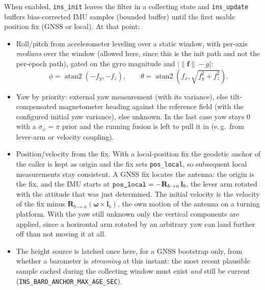 \documentclass[11pt,a4paper]{article}
\newcommand{\vect}[1]{\bm{#1}}
\newcommand{\code}[1]{\texttt{#1}}
\begin{document}
When enabled, \code{ins\_\allowbreak{}init} leaves the filter in a collecting
state and \code{ins\_\allowbreak{}update} buffers bias-corrected IMU samples (bounded
buffer) until the first usable position fix (GNSS or local). At that
point:
\begin{itemize}
  \item Roll/pitch from accelerometer leveling over a static
        window, with per-axis \emph{medians} over the window (allowed here,
        since this is the init path and not the per-epoch path), gated on the gyro magnitude and
        $\big|\|\vect{f}\| - g\big|$:
        \begin{equation}
          \phi = \operatorname{atan2}(-f_y, -f_z), \qquad
          \theta = \operatorname{atan2}\!\left(f_x,
            \sqrt{f_y^2 + f_z^2}\right).
        \end{equation}
  \item Yaw by priority: external yaw measurement (with its
        variance), else tilt-compensated magnetometer heading against
        the reference field (with the configured initial yaw variance),
        else unknown. In the last case yaw stays $0$ with a $\sigma_\psi = \pi$
        prior and the running fusion is left to pull it in (e.\,g.\ from
        lever-arm or velocity coupling).
  \item Position/velocity from the fix. With a local-position
        fix the geodetic anchor of the caller is kept as origin and the fix sets
        \code{pos\_\allowbreak{}local}, so subsequent local measurements stay
        consistent. A GNSS fix locates the antenna: the origin is the fix,
        and the IMU starts at
        $\code{pos\_\allowbreak{}local} = -\mathbf{R}_{b\to n}\,\mathbf{l}_b$, the
        lever arm rotated with the attitude that was just determined. The initial
        velocity is the velocity of the fix minus
        $\mathbf{R}_{b\to n}(\boldsymbol{\omega}\times\mathbf{l}_b)$, the
        own motion of the antenna on a turning platform. With the yaw still
        unknown only the vertical components are applied, since a
        horizontal arm rotated by an arbitrary yaw can land further off
        than not moving it at all.
  \item The height source is latched once here, for a GNSS bootstrap only,
        from whether a barometer is \emph{streaming} at this instant: the most
        recent plausible sample cached during the collecting window must exist
        \emph{and} still be current (\code{INS\_\allowbreak{}BARO\_\allowbreak{}ANCHOR\_\allowbreak{}MAX\_\allowbreak{}AGE\_\allowbreak{}SEC}).

\end{itemize}
\end{document}
